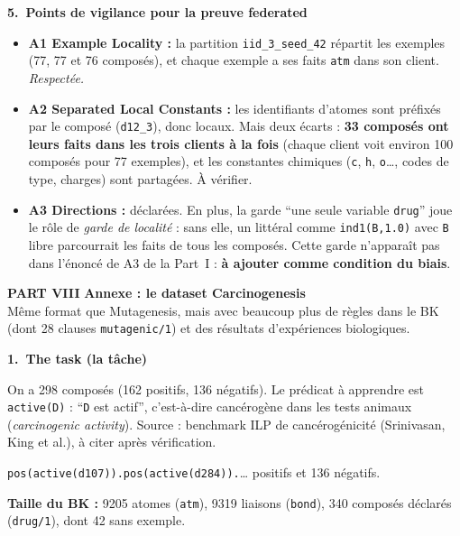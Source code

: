 \documentclass[10pt]{article}
\newcommand{\titrebox}[2]{\needspace{10\baselineskip}\vspace{8pt}
  \begin{tcolorbox}[colback=marine, colframe=marine, arc=0pt, boxrule=0pt,
    top=4pt, bottom=4pt, left=8pt]
  \color{white}\Large\bfseries #1.~#2
  \end{tcolorbox}\vspace{2pt}}
\newcommand{\partie}[3]{\newpage
  \begin{tcolorbox}[colback=pastel, colframe=pastel, arc=0pt, boxrule=0pt,
    top=8pt, bottom=8pt, left=10pt]
  {\fontsize{26}{28}\selectfont\bfseries\textcolor{marine}{PART #1}}\quad
  {\Large\bfseries\textcolor{encre}{#2}}\\[2pt]{\small #3}
  \end{tcolorbox}\vspace{4pt}}
\begin{document}
\titrebox{5}{Points de vigilance pour la preuve federated}
\begin{itemize}
  \item \textbf{A1 Example Locality :} la partition \texttt{iid\_3\_seed\_42} répartit les exemples (77, 77 et 76 composés), et chaque exemple a ses faits \texttt{atm} dans son client. \emph{Respectée.}
  \item \textbf{A2 Separated Local Constants :} les identifiants d'atomes sont préfixés par le composé (\texttt{d12\_3}), donc locaux. Mais deux écarts : \textbf{33 composés ont leurs faits dans les trois clients à la fois} (chaque client voit environ 100 composés pour 77 exemples), et les constantes chimiques (\texttt{c}, \texttt{h}, \texttt{o}\ldots, codes de type, charges) sont partagées. À vérifier.
  \item \textbf{A3 Directions :} déclarées. En plus, la garde ``une seule variable \texttt{drug}'' joue le rôle de \emph{garde de localité} : sans elle, un littéral comme \texttt{ind1(B,1.0)} avec \texttt{B} libre parcourrait les faits de tous les composés. Cette garde n'apparaît pas dans l'énoncé de A3 de la Part~I : \textbf{à ajouter comme condition du biais}.
\end{itemize}

\partie{VIII}{Annexe : le dataset Carcinogenesis}{Même format que Mutagenesis, mais avec beaucoup plus de règles dans le BK (dont 28 clauses \texttt{mutagenic/1}) et des résultats d'expériences biologiques.}

\titrebox{1}{The task (la tâche)}
On a 298 composés (162 positifs, 136 négatifs). Le prédicat à apprendre est \texttt{active(D)} : ``\texttt{D} est actif'', c'est-à-dire cancérogène dans les tests animaux (\emph{carcinogenic activity}). Source : benchmark ILP de cancérogénicité (Srinivasan, King et al.), à citer après vérification.
\begin{moi}
\texttt{pos(active(d107)).}\quad \texttt{pos(active(d284)).}\quad \ldots{} positifs et 136 négatifs.
\end{moi}
\textbf{Taille du BK :} 9205 atomes (\texttt{atm}), 9319 liaisons (\texttt{bond}), 340 composés déclarés (\texttt{drug/1}), dont 42 sans exemple.
\end{document}
